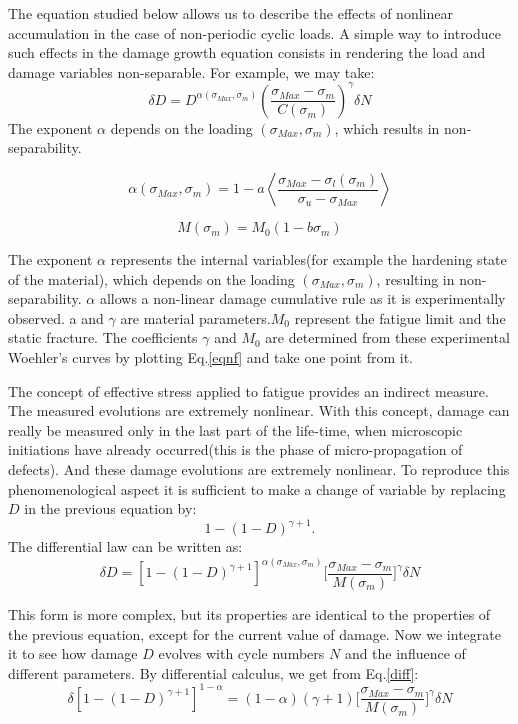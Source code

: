 \documentclass[3p,times,procedia,number]{elsarticle}
\begin{document}
The equation studied below allows us to describe the effects of nonlinear accumulation in the case of non-periodic cyclic loads\cite{FFE:FFE1}. A simple way to introduce such effects in the damage growth equation consists in rendering the load and damage variables non-separable. For example, we may take:
$$\delta D=D^{\alpha(\sigma_{Max},\sigma_m)}\left(\frac{\sigma_{Max}-\sigma_m}{C(\sigma_m)}\right)^\gamma\delta N$$
The exponent $\alpha$ depends on the loading $(\sigma_{Max},\sigma_m)$, which results in non-separability.

\vspace{6pt}
$$\alpha(\sigma_{Max},\sigma_m)=1-a\left\langle\dfrac{\sigma_{Max}-\sigma_l(\sigma_m)}{\sigma_u-\sigma_{Max}}\right\rangle$$
\vspace{6pt}

$$ M(\sigma_m)=M_0(1-b\sigma_m)$$ 
\vspace{6pt}

The exponent $\alpha$ represents the internal variables(for example the hardening state of the material), which depends on the loading $(\sigma_{Max},\sigma_m)$, resulting in non-separability. $\alpha$  allows a non-linear damage cumulative rule as it is experimentally observed. a and $\gamma$ are material parameters.$M_0$ represent the fatigue limit and the static fracture. The coefficients $\gamma$ and $M_0$ are determined from these experimental Woehler's curves by plotting Eq.\eqref{eqnf} and take one point from it. 

The concept of effective stress applied to fatigue provides an indirect measure. The measured evolutions are extremely nonlinear. With this concept, damage can really be measured only in the last part of the life-time, when microscopic initiations have already occurred(this is the phase of micro-propagation of defects). And these damage evolutions are extremely nonlinear. To reproduce this phenomenological aspect it is sufficient to make a change of variable by replacing $D$ in the previous equation by:
$$1-(1-D)^{\gamma+1}.$$
The differential law can be written as:
\begin{equation}\delta D=[1-(1-D)^{\gamma+1}]^{\alpha(\sigma_{Max},\sigma_m)}\big[\frac{\sigma_{Max}-\sigma_m}{M(\sigma_m)}\big]^\gamma\delta N
\label{diff}
\end{equation}

This form is more complex, but its properties are identical to the properties of the previous equation, except for the current value of damage. Now we integrate it to see how damage $D$ evolves with cycle numbers $N$ and the influence of different parameters. By differential calculus, we get from Eq.\eqref{diff}:
\begin{equation}\delta [1-(1-D)^{\gamma+1}]^{1-\alpha}=(1-\alpha)(\gamma+1)\big[\frac{\sigma_{Max}-\sigma_m}{M(\sigma_m)}\big]^\gamma\delta N
\label{easyintegration}
\end{equation}
\end{document}
